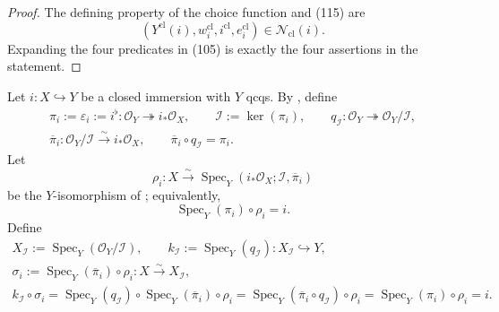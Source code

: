 \begin{proof}
  The defining property of the choice function and (115) are
  \[
    (Y^{\mathrm{cl}}(i),w_i^{\mathrm{cl}},
      i^{\mathrm{cl}},e_i^{\mathrm{cl}})
      \in\mathscr N_{\mathrm{cl}}(i).
  \]
  Expanding the four predicates in (105) is exactly the four assertions in
  the statement.
\end{proof}
\begin{definition}
  \label{def:nagata-closed-subscheme-fp-system}
  \lean{}

  Let $i\colon X\hookrightarrow Y$ be a closed immersion with $Y$ qcqs.
  By , define
  \[
  \begin{gathered}
    \pi_i:=\varepsilon_i:=i^\flat\colon
      \mathcal O_Y\twoheadrightarrow i_*\mathcal O_X,
    \qquad
    \mathcal I:=\ker(\pi_i),
    \qquad
    q_{\mathcal I}\colon\mathcal O_Y\twoheadrightarrow
      \mathcal O_Y/\mathcal I,\\
    \overline\pi_i\colon\mathcal O_Y/\mathcal I
      \xrightarrow{\sim}i_*\mathcal O_X,
    \qquad
    \overline\pi_i\circ q_{\mathcal I}=\pi_i.                 
  \end{gathered} \tag{CSFP0}
  \]
  Let
  \[
    \rho_i\colon X\xrightarrow{\sim}
      \operatorname{Spec}_Y
        (i_*\mathcal O_X;\mathcal I,\overline\pi_i)
  \]
  be the $Y$-isomorphism of
  ; equivalently,
  \[
    \operatorname{Spec}_Y(\pi_i)\circ\rho_i=i.
  \]
  Define
  \[
  \begin{gathered}
    X_{\mathcal I}:=\operatorname{Spec}_Y(\mathcal O_Y/\mathcal I),
    \qquad
    k_{\mathcal I}:=\operatorname{Spec}_Y(q_{\mathcal I})\colon
      X_{\mathcal I}\hookrightarrow Y,\\
    \sigma_i:=\operatorname{Spec}_Y(\overline\pi_i)\circ\rho_i
      \colon X\xrightarrow{\sim}X_{\mathcal I},\\
    k_{\mathcal I}\circ\sigma_i
      =\operatorname{Spec}_Y(q_{\mathcal I})
         \circ\operatorname{Spec}_Y(\overline\pi_i)\circ\rho_i
      =\operatorname{Spec}_Y(\overline\pi_i\circ q_{\mathcal I})
         \circ\rho_i
      =\operatorname{Spec}_Y(\pi_i)\circ\rho_i=i.              
  \end{gathered} \tag{115a}
\]
\end{definition}
